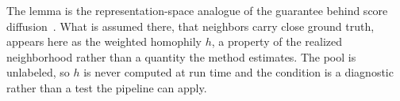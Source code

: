 The lemma is the representation-space analogue of the guarantee behind
score diffusion~\citep{zargarbashi2023conformal}. What is assumed there,
that neighbors carry close ground truth, appears here as the weighted
homophily $h$, a property of the realized neighborhood rather than a
quantity the method estimates. The pool is unlabeled, so $h$ is never
computed at run time and the condition is a diagnostic rather than a
test the pipeline can apply.


